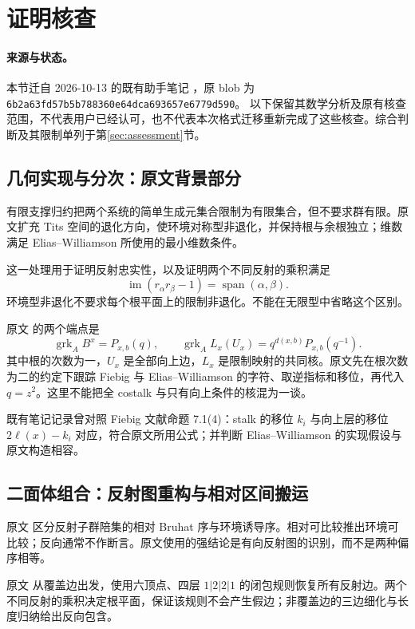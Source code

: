 \section{证明核查}\label{sec:proof-audit}
\paragraph{来源与状态。}
本节迁自 2026-10-13 的既有助手笔记 ，原 blob 为
\nolinkurl{6b2a63fd57b5b788360e64dca693657e6779d590}。
以下保留其数学分析及原有核查范围，不代表用户已经认可，也不代表本次格式迁移重新完成了这些核查。综合判断及其限制单列于第\ref{sec:assessment}节。

\subsection{几何实现与分次：原文背景部分}\label{audit:realization}
有限支撑归约把两个系统的简单生成元集合限制为有限集合，但不要求群有限。原文扩充 Tits 空间的退化方向，使环境对称型非退化，并保持根与余根独立；维数满足 Elias--Williamson 所使用的最小维数条件。

这一处理用于证明反射忠实性，以及证明两个不同反射的乘积满足
\[
\operatorname{im}(r_\alpha r_\beta-1)
 =\operatorname{span}(\alpha,\beta).
\]
环境型非退化不要求每个根平面上的限制非退化。不能在无限型中省略这个区别。

原文  的两个端点是
\[
\operatorname{grk}_A B^x=P_{x,b}(q),\qquad
\operatorname{grk}_A L_x(U_x)=q^{d(x,b)}P_{x,b}(q^{-1}).
\]
其中根的次数为一，\(U_x\) 是全部向上边，\(L_x\) 是限制映射的共同核。原文先在根次数为二的约定下跟踪 Fiebig 与 Elias--Williamson 的字符、取逆指标和移位，再代入 \(q=z^2\)。这里不能把全 costalk 与只有向上条件的核混为一谈。

既有笔记记录曾对照 Fiebig 文献\cite{Fiebig}命题 7.1(4)：stalk 的移位 \(k_i\) 与向上层的移位 \(2\ell(x)-k_i\) 对应，符合原文所用公式；并判断 Elias--Williamson\cite{EW} 的实现假设与原文构造相容。

\subsection{二面体组合：反射图重构与相对区间搬运}\label{audit:dihedral}
原文  区分反射子群陪集的相对 Bruhat 序与环境诱导序。相对可比较推出环境可比较；反向通常不作断言。原文使用的强结论是有向反射图的识别，而不是两种偏序相等。

原文  从覆盖边出发，使用六顶点、四层 \(1|2|2|1\) 的闭包规则恢复所有反射边。两个不同反射的乘积决定根平面，保证该规则不会产生假边；非覆盖边的三边细化与长度归纳给出反向包含。

